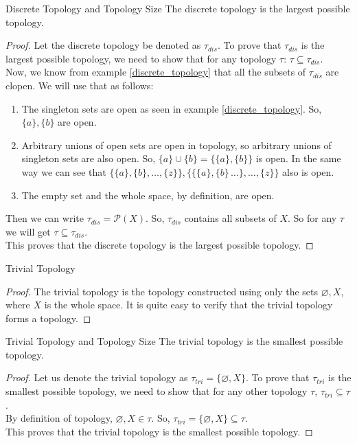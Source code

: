 \begin{Theorem}{Discrete Topology and Topology Size}\label{discrete_topology_size}
    The discrete topology is the largest possible topology.
\end{Theorem}
\begin{proof}
    Let the discrete topology be denoted as $\tau_{dis}$. To prove that $\tau_{dis}$ is the largest possible topology, we need to show that for any topology $\tau$: $\tau\subseteq\tau_{dis}$.\\
    Now, we know from example \eqref{discrete_topology} that all the subsets of $\tau_{dis}$ are clopen. We will use that as follows:
    \begin{enumerate}
        \item The singleton sets are open as seen in example \eqref{discrete_topology}. So, $\{a\},\{b\}$ are open.
        \item Arbitrary unions of open sets are open in topology, so arbitrary unions of singleton sets are also open. So, $\{a\}\cup\{b\}=\big\{\{a\},\{b\}\big\}$ is open. In the same way we can see that $\big\{\{a\},\{b\},\dots,\{z\}\big\},\big\{\{\{a\},\{b\}\,\dots\},\dots,\{z\}\big\}$ also is open. 
        \item The empty set and the whole space, by definition, are open.
    \end{enumerate}
    Then we can write $\tau_{dis}=\mathcal{P}(X)$. So, $\tau_{dis}$ contains all subsets of $X$. So for any $\tau$ we will get $\tau\subseteq\tau_{dis}$.\\
    This proves that the discrete topology is the largest possible topology.
\end{proof}
\begin{Example}\label{trivial_topology}
    Trivial Topology
\end{Example}
\begin{proof}
    The trivial topology is the topology constructed using only the sets $\varnothing, X$, where $X$ is the whole space. It is quite easy to verify that the trivial topology forms a topology.
\end{proof}
\begin{Theorem}{Trivial Topology and Topology Size}\label{trivial_topology_size}
    The trivial topology is the smallest possible topology.
\end{Theorem}
\begin{proof}
    Let us denote the trivial topology as $\tau_{tri}=\{\varnothing, X\}$. To prove that $\tau_{tri}$ is the smallest possible topology, we need to show that for any other topology $\tau$, $\tau_{tri}\subseteq\tau$.\\
    By definition of topology, $\varnothing, X\in\tau$. So, $\tau_{tri}=\{\varnothing,X\}\subseteq\tau$.\\
    This proves that the trivial topology is the smallest possible topology.
\end{proof}

